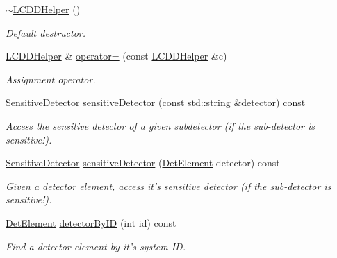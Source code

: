 \begin{DoxyCompactItemize}
\hyperlink{class_d_d4hep_1_1_geometry_1_1_l_c_d_d_helper_a11685292c888b6c1670c711912eb5563}{$\sim$LCDDHelper} ()
\begin{DoxyCompactList}\small\item\em Default destructor. \item\end{DoxyCompactList}\item 
\hyperlink{class_d_d4hep_1_1_geometry_1_1_l_c_d_d_helper}{LCDDHelper} \& \hyperlink{class_d_d4hep_1_1_geometry_1_1_l_c_d_d_helper_a98179f348166edb136409825f0e74ef7}{operator=} (const \hyperlink{class_d_d4hep_1_1_geometry_1_1_l_c_d_d_helper}{LCDDHelper} \&c)
\begin{DoxyCompactList}\small\item\em Assignment operator. \item\end{DoxyCompactList}\item 
\hyperlink{class_d_d4hep_1_1_geometry_1_1_sensitive_detector}{SensitiveDetector} \hyperlink{class_d_d4hep_1_1_geometry_1_1_l_c_d_d_helper_a0058b2f6c48397ed7883bbc7f1ad8fc2}{sensitiveDetector} (const std::string \&detector) const 
\begin{DoxyCompactList}\small\item\em Access the sensitive detector of a given subdetector (if the sub-\/detector is sensitive!). \item\end{DoxyCompactList}\item 
\hyperlink{class_d_d4hep_1_1_geometry_1_1_sensitive_detector}{SensitiveDetector} \hyperlink{class_d_d4hep_1_1_geometry_1_1_l_c_d_d_helper_af83de2eda215c174f0cbe66c5877aefb}{sensitiveDetector} (\hyperlink{class_d_d4hep_1_1_geometry_1_1_det_element}{DetElement} detector) const 
\begin{DoxyCompactList}\small\item\em Given a detector element, access it's sensitive detector (if the sub-\/detector is sensitive!). \item\end{DoxyCompactList}\item 
\hyperlink{class_d_d4hep_1_1_geometry_1_1_det_element}{DetElement} \hyperlink{class_d_d4hep_1_1_geometry_1_1_l_c_d_d_helper_a254105cb4c608b84d47b5dd0eb28f0f2}{detectorByID} (int id) const 
\begin{DoxyCompactList}\small\item\em Find a detector element by it's system ID. \item\end{DoxyCompactList}\end{DoxyCompactItemize}



